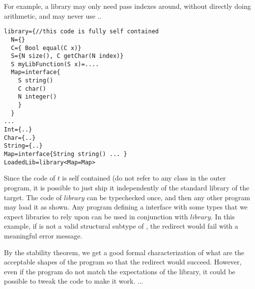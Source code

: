 For example, a library may only need pass indexes around, without directly
doing arithmetic, and may never use ..

\begin{lstlisting}
library={//this code is fully self contained
  N={}
  C={ Bool equal(C x)}
  S={N size(), C getChar(N index)}
  S myLibFunction(S x)=....
  Map=interface{
    S string()
    C char()
    N integer()
    }
  }
...
Int={..}
Char={..}
String={..}
Map=interface{String string() ... }
LoadedLib=library<Map=Map>
\end{lstlisting}
Since the code of $t$ is self contained (do not refer to any class in the outer program, it is possible to just ship it independently of the standard library of the target.
The code of $library$ can be typechecked once, and then
any other program may load it as shown.
Any program defining a \Q@Map@ interface with some types that we expect libraries to rely upon can be used in conjunction with $library$.
In this example, if \Q@Char@ is not a valid structural subtype of \Q@C@,
the redirect would fail with a meaningful error message.

By the stability theorem, we get a good formal characterization of what are the acceptable shapes of the program so that the redirect would succeed.
However, even if the program do not match the expectations of the library,
it could be possible to tweak the code to make it work.
...
